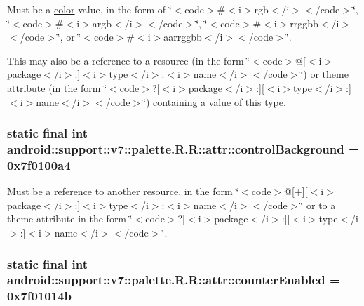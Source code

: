 Must be a \hyperlink{classandroid_1_1support_1_1v7_1_1palette_1_1_r_1_1color}{color} value, in the form of \char`\"{}$<$code$>$\#$<$i$>$rgb$<$/i$>$$<$/code$>$\char`\"{}, \char`\"{}$<$code$>$\#$<$i$>$argb$<$/i$>$$<$/code$>$\char`\"{}, \char`\"{}$<$code$>$\#$<$i$>$rrggbb$<$/i$>$$<$/code$>$\char`\"{}, or \char`\"{}$<$code$>$\#$<$i$>$aarrggbb$<$/i$>$$<$/code$>$\char`\"{}. 

This may also be a reference to a resource (in the form \char`\"{}$<$code$>$@\mbox{[}$<$i$>$package$<$/i$>$:\mbox{]}$<$i$>$type$<$/i$>$:$<$i$>$name$<$/i$>$$<$/code$>$\char`\"{}) or theme attribute (in the form \char`\"{}$<$code$>$?\mbox{[}$<$i$>$package$<$/i$>$:\mbox{]}\mbox{[}$<$i$>$type$<$/i$>$:\mbox{]}$<$i$>$name$<$/i$>$$<$/code$>$\char`\"{}) containing a value of this type. \hypertarget{classandroid_1_1support_1_1v7_1_1palette_1_1_r_1_1attr_9228aa146ccecf5e2f570bc665024b81}{
\subsubsection[{controlBackground}]{\setlength{\rightskip}{0pt plus 5cm}static final int android::support::v7::palette.R.R::attr::controlBackground = 0x7f0100a4}}
\label{classandroid_1_1support_1_1v7_1_1palette_1_1_r_1_1attr_9228aa146ccecf5e2f570bc665024b81}


Must be a reference to another resource, in the form \char`\"{}$<$code$>$@\mbox{[}+\mbox{]}\mbox{[}$<$i$>$package$<$/i$>$:\mbox{]}$<$i$>$type$<$/i$>$:$<$i$>$name$<$/i$>$$<$/code$>$\char`\"{} or to a theme attribute in the form \char`\"{}$<$code$>$?\mbox{[}$<$i$>$package$<$/i$>$:\mbox{]}\mbox{[}$<$i$>$type$<$/i$>$:\mbox{]}$<$i$>$name$<$/i$>$$<$/code$>$\char`\"{}. \hypertarget{classandroid_1_1support_1_1v7_1_1palette_1_1_r_1_1attr_40c267b0c49aa467c1480f6008eb51e6}{
\subsubsection[{counterEnabled}]{\setlength{\rightskip}{0pt plus 5cm}static final int android::support::v7::palette.R.R::attr::counterEnabled = 0x7f01014b}}
\label{classandroid_1_1support_1_1v7_1_1palette_1_1_r_1_1attr_40c267b0c49aa467c1480f6008eb51e6}


